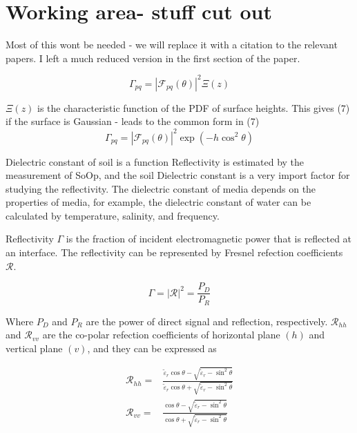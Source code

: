 \documentclass[draftcls,onecolumn]{IEEEtran}  %
\begin{document}
\section{Working area- stuff cut out}

Most of this wont be needed - we will replace it with a citation to the relevant papers. I left a much reduced version in the first section of the paper. 


\begin{equation}
\Gamma_{pq} = \left| \mathcal{F}_{pq}(\theta) \right|^2 \Xi (z)
\end{equation}

$\Xi(z)$ is the characteristic function of the PDF of surface heights.  This gives (7) if the surface is Gaussian - leads to the common form in (7)
\begin{equation}
\Gamma_{pq} = \left| \mathcal{F}_{pq}(\theta) \right|^2 \exp \left( - h \cos^2 \theta \right)
\end{equation}

Dielectric constant of soil is a function Reflectivity is estimated by the measurement of SoOp, and the soil Dielectric constant is a very import factor for studying the reflectivity. The dielectric constant of media depends on the properties of media, for example, the dielectric constant of water can be calculated by temperature, salinity, and frequency.


Reflectivity $\Gamma$ is the fraction of incident electromagnetic power that is reflected at an interface. The reflectivity can be represented by Fresnel refection coefficients $\mathcal{R}$.

\begin{equation}
\Gamma = |\mathcal{R}|^2=\frac{P_D}{P_R}
\end{equation}

Where $P_D$ and $P_R$ are the power of direct signal and reflection, respectively. $\mathcal{R}_{hh}$ and $\mathcal{R}_{vv}$ are the co-polar refection coefficients of horizontal plane $(h)$ and vertical plane $(v)$, and they can be expressed as

\begin{equation} 
\begin{split}
	{\mathcal{R}_{hh}} = {}& \frac{{{{\tilde \varepsilon }_r}\cos \theta  - \sqrt 				{{{\tilde \varepsilon }_r} - {{\sin }^2}\theta } }}{{{{\tilde \varepsilon}_r}				\cos \theta  + \sqrt {{{\tilde \varepsilon }_r} - {{\sin }^2}\theta }}}
\\
	{\mathcal{R}_{vv}} = {}& \frac{{\cos \theta  - \sqrt {{{\tilde \varepsilon }_r} - {{\sin }^2}\theta } }}{{\cos \theta  + \sqrt {{{\tilde \varepsilon }_r} - {{\sin }^2}\theta }}} 
    \end{split}
     \label{Eq: reflectivity_di}
\end{equation}
\end{document}
